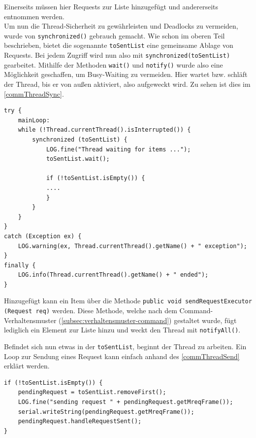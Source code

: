 Einerseits müssen hier Requests zur Liste hinzugefügt und andererseits entnommen werden.\\
Um nun die Thread-Sicherheit zu gewährleisten und Deadlocks zu vermeiden, wurde von \lstinline[style=java]{synchronized()} gebrauch gemacht.
Wie schon im oberen Teil beschrieben, bietet die sogenannte \lstinline[style=java]{toSentList} eine gemeinsame Ablage von Requests.
Bei jedem Zugriff wird nun also mit \lstinline[style=java]{synchronized(toSentList)} gearbeitet.
Mithilfe der Methoden \lstinline[style=java]{wait()} und \lstinline[style=java]{notify()} wurde also eine Möglichkeit geschaffen, um Busy-Waiting zu vermeiden.
Hier wartet bzw. schläft der Thread, bis er von außen aktiviert, also aufgeweckt wird.
Zu sehen ist dies im \autoref{commThreadSync}.
\begin{lstlisting}[style=java,caption=Teilabschnitt CommunicationSendThread,label=commThreadSync]
try {
    mainLoop:
    while (!Thread.currentThread().isInterrupted()) {
        synchronized (toSentList) {
            LOG.fine("Thread waiting for items ...");
            toSentList.wait();

            if (!toSentList.isEmpty()) {
            ....
            }
        }
    }
}
catch (Exception ex) {
    LOG.warning(ex, Thread.currentThread().getName() + " exception");
}
finally {
    LOG.info(Thread.currentThread().getName() + " ended");
}
\end{lstlisting}
Hinzugefügt kann ein Item über die Methode \lstinline[style=java]{public void sendRequestExecutor (Request req)} werden.
Diese Methode, welche nach dem Command-Verhaltensmuster (\autoref{subsec:verhaltensmuster-command}) gestaltet wurde, fügt lediglich ein Element zur Liste hinzu und weckt den Thread mit \lstinline[style=java]{notifyAll()}.

Befindet sich nun etwas in der \lstinline[style=java]{toSentList}, beginnt der Thread zu arbeiten.
Ein Loop zur Sendung eines Request kann einfach anhand des \autoref{commThreadSend} erklärt werden.
\begin{lstlisting}[style=java,caption=Teilabschnitt CommunicationSendThread,label=commThreadSend]
if (!toSentList.isEmpty()) {
    pendingRequest = toSentList.removeFirst();
    LOG.fine("sending request " + pendingRequest.getMreqFrame());
    serial.writeString(pendingRequest.getMreqFrame());
    pendingRequest.handleRequestSent();
}
\end{lstlisting}
